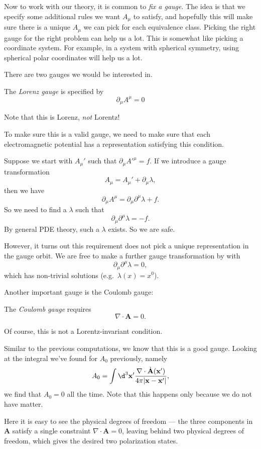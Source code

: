 \documentclass[a4paper]{article}
\begin{document}
Now to work with our theory, it is common to \emph{fix a gauge}. The idea is that we specify some additional rules we want $A_\mu$ to satisfy, and hopefully this will make sure there is a unique $A_\mu$ we can pick for each equivalence class. Picking the right gauge for the right problem can help us a lot. This is somewhat like picking a coordinate system. For example, in a system with spherical symmetry, using spherical polar coordinates will help us a lot.

There are two gauges we would be interested in.
\begin{defi}
  The \emph{Lorenz gauge} is specified by
  \[
    \partial_\mu A^\mu = 0
  \]
\end{defi}
Note that this is Lorenz, \emph{not} Lorentz!

To make sure this is a valid gauge, we need to make sure that each electromagnetic potential has a representation satisfying this condition.

Suppose we start with $A_\mu'$ such that $\partial_\mu A'^\mu = f$. If we introduce a gauge transformation
\[
  A_\mu = A_\mu' + \partial_\mu \lambda,
\]
then we have
\[
  \partial_\mu A^\mu = \partial_\mu \partial^\mu \lambda + f.
\]
So we need to find a $\lambda$ such that
\[
  \partial_\mu \partial^\mu \lambda = -f.
\]
By general PDE theory, such a $\lambda$ exists. So we are safe.

However, it turns out this requirement does not pick a unique representation in the gauge orbit. We are free to make a further gauge transformation by with
\[
  \partial_\mu \partial^\mu \lambda = 0,
\]
which has non-trivial solutions (e.g.\ $\lambda(x) = x^0$).

Another important gauge is the Coulomb gauge:
\begin{defi}
  The \emph{Coulomb gauge} requires
  \[
    \nabla \cdot \mathbf{A} = 0.
  \]
\end{defi}
Of course, this is not a Lorentz-invariant condition.

Similar to the previous computations, we know that this is a good gauge. Looking at the integral we've found for $A_0$ previously, namely
\[
  A_0 = \int \d^3 \mathbf{x}' \frac{\nabla \cdot \dot{\mathbf{A}}(\mathbf{x}')}{4\pi|\mathbf{x} - \mathbf{x}'|},
\]
we find that $A_0 = 0$ all the time. Note that this happens only because we do not have matter.

Here it is easy to see the physical degrees of freedom --- the three components in $\mathbf{A}$ satisfy a single constraint $\nabla \cdot \mathbf{A} = 0$, leaving behind two physical degrees of freedom, which gives the desired two polarization states.
\end{document}
